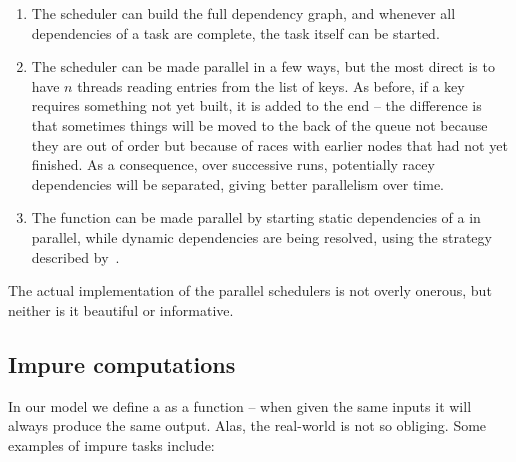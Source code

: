 \begin{enumerate}
\item The  scheduler can build the full dependency graph, and
whenever all dependencies of a task are complete, the task itself can be
started.

\item The  scheduler can be made parallel in a few ways, but the
most direct is to have $n$ threads reading entries from the list of keys. As
before, if a key requires something not yet built, it is added to the end -- the
difference is that sometimes things will be moved to the back of the queue not
because they are out of order but because of races with earlier nodes that had
not yet finished. As a consequence, over successive runs, potentially racey
dependencies will be separated, giving better parallelism over time.

\item The  function can be made parallel by starting static
dependencies of a  in parallel, while dynamic dependencies are being
resolved, using the strategy described by~\citet{marlow2014haxl}.
\end{enumerate}

The actual implementation of the parallel schedulers is not overly onerous,
but neither is it beautiful or informative.

\subsection{Impure computations}\label{sec-non-determinism}

In our model we define a  as a function -- when given the same inputs
it will always produce the same output. Alas, the real-world is not so obliging.
Some examples of impure tasks include:


